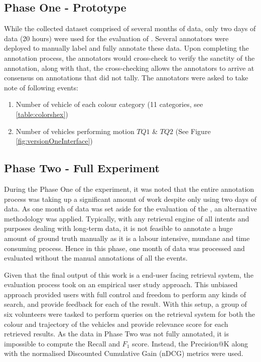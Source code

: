 \subsection{Phase One - Prototype}
While the collected dataset comprised of several months of data, only two days of data (20 hours) were used for the evaluation of \versionOneRet. Several annotators were deployed to manually label and fully annotate these data. Upon completing the annotation process, the annotators would cross-check to verify the sanctity of the annotation, along with that, the cross-checking allows the annotators to arrive at consensus on annotations that did not tally. The annotators were asked to take note of following events:
\begin{enumerate}
    \item Number of vehicle of each colour category (11 categories, see \ref{table:colorshex})
    \item Number of vehicles performing motion $TQ1$ \& $TQ2$ (See Figure \ref{fig:versionOneInterface})
\end{enumerate}



\subsection{Phase Two - Full Experiment}

During the Phase One of the experiment, it was noted that the entire annotation process was taking up a significant amount of work despite only using two days of data. As one month of data was set aside for the evaluation of the \versionTwoRet, an alternative methodology was applied. Typically, with any retrieval engine of all intents and purposes dealing with long-term data, it is not feasible to annotate a huge amount of ground truth manually as it is a labour intensive, mundane and time consuming process. Hence in this phase, one month of data was processed and evaluated without the manual annotations of all the events. 

Given that the final output of this work is a end-user facing retrieval system, the evaluation process took on an empirical user study approach. This unbiased approach provided users with full control and freedom to perform any kinds of search, and provide feedback for each of the result.
With this setup, a group of six volunteers were tasked to perform queries on the retrieval system for both the colour and trajectory of the vehicles and provide relevance score for each retrieved results. 
As the data in Phase Two was not fully annotated, it is impossible to compute the Recall and $F_1$ score. Instead, the Precision@K along with the normalised Discounted Cumulative Gain (nDCG) metrics were used. 

